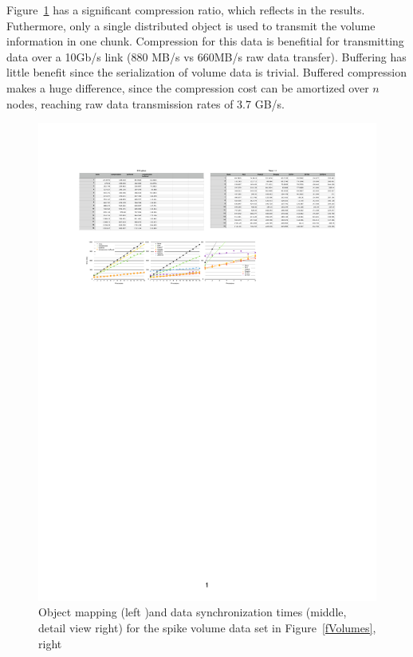 \documentclass[10pt,journal,compsoc]{IEEEtran}
\newcommand{\fig}[1]{Figure~\ref{#1}}
\begin{document}
\fig{fSpikesDist} has a significant compression ratio, which reflects in the
results. Futhermore, only a single distributed object is used to transmit the
volume information in one chunk. Compression for this data is benefitial for
transmitting data over a 10Gb/s link (880 MB/s vs 660MB/s raw data
transfer). Buffering has little benefit since the serialization of volume data
is trivial. Buffered compression makes a huge difference, since the compression
cost can be amortized over $n$ nodes, reaching raw data transmission rates of
3.7 GB/s.

\begin{figure}[ht]\center
  \includegraphics[width=\textwidth]{images/spikesdist}
  \caption{\label{fSpikesDist}Object mapping (left )and data synchronization
    times (middle, detail view right) for the spike volume data set in
    \fig{fVolumes}, right}
\end{figure}
\end{document}
